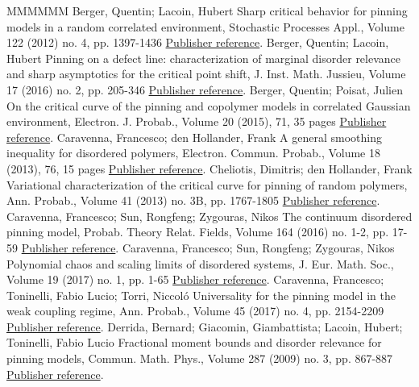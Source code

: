 \documentclass[11pt]{article}
\theoremstyle{definition}
\numberwithin{equation}{section}
\numberwithin{figure}{section}
\numberwithin{table}{section}
\begin{document}
\begin{thebibliography}{MMMMMM}
 Berger, Quentin; Lacoin, Hubert Sharp critical behavior for pinning models in a random correlated environment, Stochastic Processes Appl., Volume 122 (2012) no. 4, pp. 1397-1436 \href{https://ahl.centre-mersenne.org/item/AHL_2019__2__281_0/#BL12}{Publisher reference}.
 Berger, Quentin; Lacoin, Hubert Pinning on a defect line: characterization of marginal disorder relevance and sharp asymptotics for the critical point shift, J. Inst. Math. Jussieu, Volume 17 (2016) no. 2, pp. 205-346 \href{https://ahl.centre-mersenne.org/item/AHL_2019__2__281_0/#BL15}{Publisher reference}.
 Berger, Quentin; Poisat, Julien On the critical curve of the pinning and copolymer models in correlated Gaussian environment, Electron. J. Probab., Volume 20 (2015), 71, 35 pages \href{https://ahl.centre-mersenne.org/item/AHL_2019__2__281_0/#BP15}{Publisher reference}.
 Caravenna, Francesco; den Hollander, Frank A general smoothing inequality for disordered polymers, Electron. Commun. Probab., Volume 18 (2013), 76, 15 pages \href{https://ahl.centre-mersenne.org/item/AHL_2019__2__281_0/#CadH13}{Publisher reference}.
 Cheliotis, Dimitris; den Hollander, Frank Variational characterization of the critical curve for pinning of random polymers, Ann. Probab., Volume 41 (2013) no. 3B, pp. 1767-1805 \href{https://ahl.centre-mersenne.org/item/AHL_2019__2__281_0/#CdH13}{Publisher reference}.
 Caravenna, Francesco; Sun, Rongfeng; Zygouras, Nikos The continuum disordered pinning model, Probab. Theory Relat. Fields, Volume 164 (2016) no. 1-2, pp. 17-59 \href{https://ahl.centre-mersenne.org/item/AHL_2019__2__281_0/#CSZ16}{Publisher reference}.
 Caravenna, Francesco; Sun, Rongfeng; Zygouras, Nikos Polynomial chaos and scaling limits of disordered systems, J. Eur. Math. Soc., Volume 19 (2017) no. 1, pp. 1-65 \href{https://ahl.centre-mersenne.org/item/AHL_2019__2__281_0/#CSZ16+}{Publisher reference}.
 Caravenna, Francesco; Toninelli, Fabio Lucio; Torri, Niccoló Universality for the pinning model in the weak coupling regime, Ann. Probab., Volume 45 (2017) no. 4, pp. 2154-2209 \href{https://ahl.centre-mersenne.org/item/AHL_2019__2__281_0/#CTT16+}{Publisher reference}.
 Derrida, Bernard; Giacomin, Giambattista; Lacoin, Hubert; Toninelli, Fabio Lucio Fractional moment bounds and disorder relevance for pinning models, Commun. Math. Phys., Volume 287 (2009) no. 3, pp. 867-887 \href{https://ahl.centre-mersenne.org/item/AHL_2019__2__281_0/#DGLT09}{Publisher reference}.

\end{thebibliography}
\end{document}
